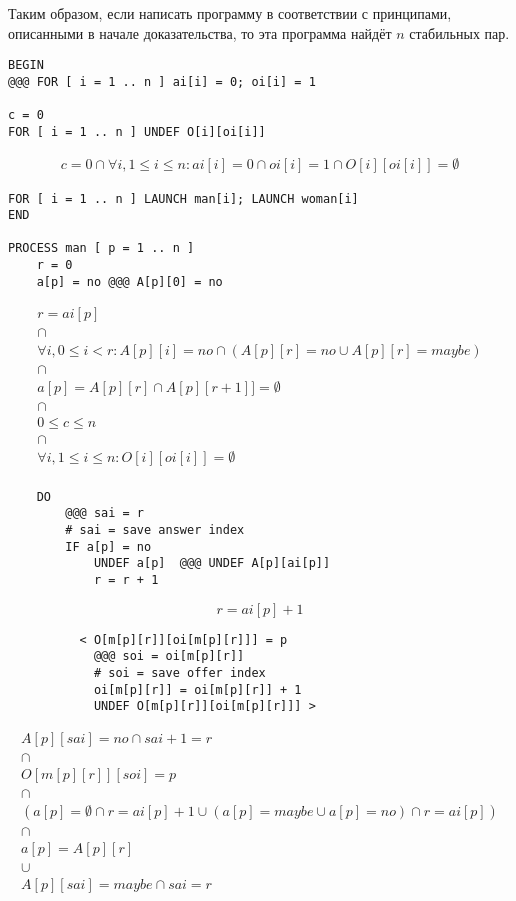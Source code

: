 \documentclass{article}
\begin{document}
Таким образом, если написать программу в соответствии с принципами, описанными в начале доказательства, то эта программа найдёт
\( n \) стабильных пар.

\begin{verbatim}
BEGIN
@@@ FOR [ i = 1 .. n ] ai[i] = 0; oi[i] = 1

c = 0
FOR [ i = 1 .. n ] UNDEF O[i][oi[i]]
\end{verbatim}
\begin{displaymath}
\begin{array}{c}
c = 0 \cap \forall i, 1 \leq i \leq n : ai[i] = 0 \cap oi[i] = 1 \cap O[i][oi[i]] = \emptyset
\end{array}
\end{displaymath}
\begin{verbatim}
FOR [ i = 1 .. n ] LAUNCH man[i]; LAUNCH woman[i]
END

PROCESS man [ p = 1 .. n ]
    r = 0
    a[p] = no @@@ A[p][0] = no
\end{verbatim}
\begin{displaymath}
\begin{array}{c}
r = ai[p] \\
\cap \\
\forall i, 0 \leq i < r : A[p][i] = no \cap (A[p][r] = no \cup A[p][r] = maybe)\\
\cap \\
a[p] = A[p][r] \cap A[p][r + 1]] = \emptyset \\
\cap \\
0 \leq c \leq n \\
\cap \\
\forall i, 1 \leq i \leq n : O[i][oi[i]] = \emptyset\\
\end{array}
\end{displaymath}
\begin{verbatim}
    DO
        @@@ sai = r
        # sai = save answer index
        IF a[p] = no
            UNDEF a[p]  @@@ UNDEF A[p][ai[p]]
            r = r + 1
\end{verbatim}
\begin{displaymath}
r = ai[p] + 1
\end{displaymath}
\begin{verbatim}
          < O[m[p][r]][oi[m[p][r]]] = p
            @@@ soi = oi[m[p][r]]
            # soi = save offer index
            oi[m[p][r]] = oi[m[p][r]] + 1
            UNDEF O[m[p][r]][oi[m[p][r]]] >
\end{verbatim}
\begin{displaymath}
\begin{array}{c}
A[p][sai] = no \cap sai + 1 = r \\
\cap \\
O[m[p][r]][soi] = p \\
\cap \\
(a[p] = \emptyset \cap r = ai[p] + 1 \cup (a[p] = maybe \cup a[p] = no) \cap r = ai[p]) \\
\cap \\
a[p] = A[p][r] \\
\cup \\
A[p][sai] = maybe \cap sai = r
\end{array}
\end{displaymath}
\end{document}
